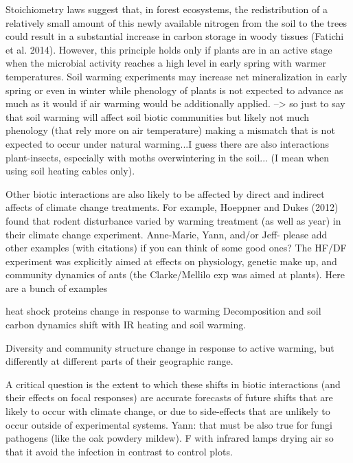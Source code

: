 \documentclass{article}
\begin{document}
Stoichiometry laws suggest that, in forest ecosystems, the redistribution of a relatively small amount of this newly available nitrogen from the soil to the trees could result in a substantial increase in carbon storage in woody tissues (Fatichi et al. 2014). However, this principle holds only if plants are in an active stage when the microbial activity reaches a high level in early spring with warmer temperatures. Soil warming experiments may increase net mineralization in early spring or even in winter while phenology of plants is not expected to advance as much as it would if air warming would be additionally applied.
--> so just to say that soil warming will affect soil biotic communities but likely not much phenology (that rely more on air temperature) making a mismatch that is not expected to occur under natural warming...I guess there are also interactions plant-insects, especially with moths overwintering in the soil... (I mean when using soil heating cables only). 

\par Other biotic interactions are also likely to be affected by direct and indirect affects of climate change treatments. For example, Hoeppner and Dukes (2012) found that rodent disturbance varied by warming treatment (as well as year) in their climate change experiment. Anne-Marie, Yann, and/or Jeff- please add other examples (with citations) if you can think of some good ones? 
The HF/DF experiment was explicitly aimed at effects on physiology, genetic make up, and community dynamics of ants (the Clarke/Mellilo exp was aimed at plants). Here are a bunch of examples

heat shock proteins change in response to warming  \citep{stanton2016}
Decomposition and soil carbon dynamics shift with IR heating and soil warming\citep{deltoro2015}. 

Diversity and community structure change in response to active warming, but differently at different parts of their geographic range. \citep{pelini2014;diamond2016}


A critical question is the extent to which these shifts in biotic interactions (and their effects on focal responses) are accurate forecasts of future shifts that are likely to occur with climate change, or due to side-effects that are unlikely to occur outside of experimental systems. \citep{diamond2013}
Yann: that must be also true for fungi pathogens (like the oak powdery mildew). F with infrared lamps drying air so that it avoid the infection in contrast to control plots.
\end{document}
